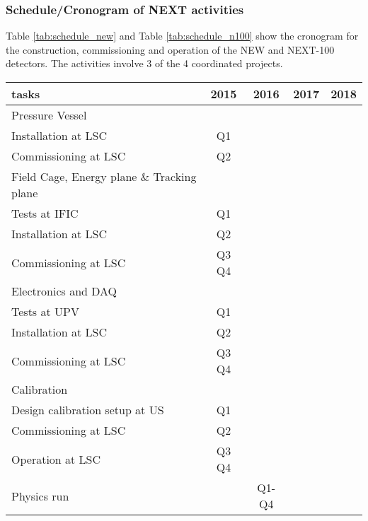 

\subsubsection*{Schedule/Cronogram of NEXT activities}

Table \ref{tab:schedule_new} and Table \ref{tab:schedule_n100} show the cronogram for the construction, commissioning and operation of the NEW and NEXT-100 detectors. The activities involve 3 of the 4 coordinated projects. 

\begin{center}
\begin{tabular}{| l | c | c | c | c |}
\hline
tasks & 2015 & 2016 & 2017 & 2018 \\
\hline
Pressure Vessel & & & &   \\
\hline
Installation at LSC & Q1 & & & \\
Commissioning at LSC & Q2 & & & \\
\hline
Field Cage, Energy plane \& Tracking plane & & & &   \\
\hline
Tests at IFIC & Q1 & & & \\
Installation at LSC & Q2 & & & \\
Commissioning at LSC & Q3 Q4 & & & \\
\hline
Electronics and DAQ & & & &   \\
\hline
Tests at UPV & Q1 & & & \\
Installation at LSC & Q2 & & & \\
Commissioning at LSC & Q3 Q4 & & & \\
\hline
Calibration & & & &   \\
\hline
Design calibration setup at US & Q1 & & & \\
Commissioning at LSC & Q2 & & & \\
Operation at LSC & Q3 Q4 & & & \\
\hline
Physics run & & Q1-Q4& &   \\
\hline
\hline
\end{tabular}
\label{tab:schedule_new}
\end{center}

